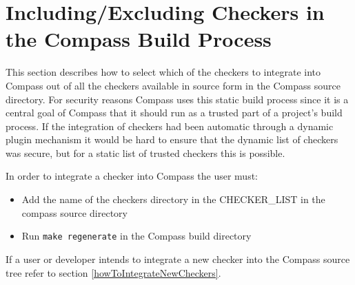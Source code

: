%
%
%
%
%
%



\section{Including/Excluding Checkers in the Compass Build Process}
\label{CompassBuildProcess}

   This section describes how to select which of the checkers to integrate 
into Compass out of all the checkers available in source form in the Compass 
source directory. For security reasons Compass uses this static build process 
since it is a central goal of Compass that it should run as a trusted part of 
a project's build process. If the integration of checkers had been automatic 
through a dynamic plugin mechanism it would be hard to ensure that the dynamic 
list of checkers was secure, but for a static list of trusted checkers this is 
possible.

In order to integrate a checker into Compass the user must:
\begin{itemize}
   \item Add the name of the checkers directory in the CHECKER\_LIST in the compass
      source directory
   \item Run {\tt make regenerate} in the Compass build directory
\end{itemize} 
If a user or developer intends to integrate a new checker into the Compass 
source tree refer to section \ref{howToIntegrateNewCheckers}.


